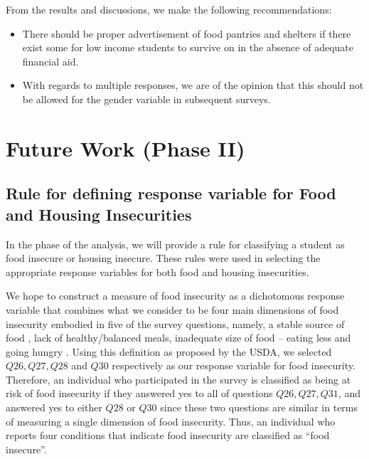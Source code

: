 \documentclass[
  10pt,
]{article}
\begin{document}
From the results and discussions, we make the following recommendations:

\begin{itemize}
\item
  There should be proper advertisement of food pantries and shelters if there exist some for low income students to survive on in the absence of adequate financial aid.
\item
  With regards to multiple responses, we are of the opinion that this should not be allowed for the gender variable in subsequent surveys.
\end{itemize}

\hypertarget{future-work-phase-ii}{%
\section{Future Work (Phase II)}\label{future-work-phase-ii}}

\hypertarget{rule-for-defining-response-variable-for-food-and-housing-insecurities}{%
\subsection{Rule for defining response variable for Food and Housing Insecurities}\label{rule-for-defining-response-variable-for-food-and-housing-insecurities}}

In the phase of the analysis, we will provide a rule for classifying a student as food insecure or housing insecure. These rules were used in selecting the appropriate response variables for both food and housing insecurities.

We hope to construct a measure of food insecurity as a dichotomous response variable that combines what we consider to be four main dimensions of food insecurity embodied in five of the survey questions, namely, a stable source of food , lack of healthy/balanced meals, inadequate size of food -- eating less and going hungry . Using this definition as proposed by the USDA, we selected \(Q26, Q27, Q28\) and \(Q30\) respectively as our response variable for food insecurity. Therefore, an individual who participated in the survey is classified as being at risk of food insecurity if they answered yes to all of questions \(Q26, Q27, Q31\), and answered yes to either \(Q28\) or \(Q30\) since these two questions are similar in terms of measuring a single dimension of food insecurity. Thus, an individual who reports four conditions that indicate food insecurity are classified as ``food insecure''.
\end{document}
